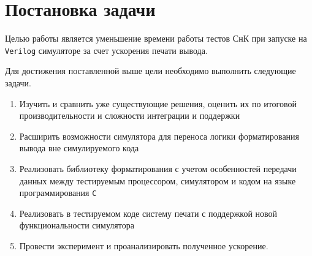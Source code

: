 
\section{Постановка задачи}
\label{sec:task}

Целью работы является уменьшение времени работы тестов СнК при запуске на \texttt{Verilog} симуляторе за счет ускорения печати вывода.

Для достижения поставленной выше цели необходимо выполнить следующие задачи.
\begin{enumerate}
    \item Изучить и сравнить уже существующие решения, оценить их по итоговой производительности и сложности интеграции и поддержки
    \item Расширить возможности симулятора для переноса логики форматирования вывода вне симулируемого кода
    \item Реализовать библиотеку форматирования с учетом особенностей передачи данных между тестируемым процессором, симулятором и кодом на языке программирования \texttt{C}
    \item Реализовать в тестируемом коде систему печати с поддержкой новой функциональности симулятора
    \item Провести эксперимент и проанализировать полученное ускорение.
\end{enumerate}
